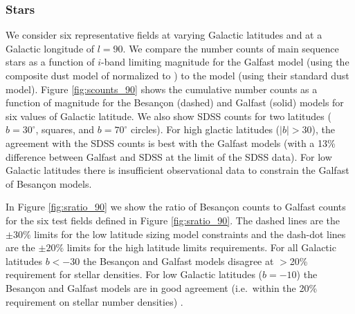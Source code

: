 \documentclass[11pt]{article}
\begin{document}
\subsubsection{Stars}
We consider six representative fields at varying Galactic latitudes
and at a Galactic longitude of $l=90$.  We compare the number counts
of main sequence stars as a function of $i$-band limiting magnitude
for the Galfast model \citep{juric} (using the composite dust model of
\citet{amores05} normalized to \citet{schlegel98}) to the
\citet{besancon} model (using their standard dust model).  Figure
\ref{fig:scounts_90} shows the cumulative number counts as a function
of magnitude for the Besan\c{c}on (dashed) and Galfast (solid) models
for six values of Galactic latitude.  We also show SDSS counts for two
latitudes ($b=30^{\circ}$, squares, and $b=70^{\circ}$ circles).  For
high glactic latitudes ($|b| >30$), the agreement with the SDSS counts
is best with the Galfast models (with a 13\% difference between
Galfast and SDSS at the limit of the SDSS data). For low Galactic
latitudes there is insufficient observational data to constrain the
Galfast of Besan\c{c}on models.

In Figure \ref{fig:sratio_90} we show the ratio of Besan\c{c}on counts
to Galfast counts for the six test fields defined in Figure
\ref{fig:sratio_90}.  The dashed lines are the $\pm30\%$ limits for
the low latitude sizing model constraints and the dash-dot lines are
the $\pm20\%$ limits for the high latitude limits requirements. 
For all Galactic latitudes $b<-30$ the Besan\c{c}on and Galfast models
disagree at $>$20\% requirement for stellar densities. For low
Galactic latitudes ($b=-10$) the Besan\c{c}on  and Galfast models are
in good agreement (i.e.\ within the 20\% requirement on stellar number densities) .


\end{document}
